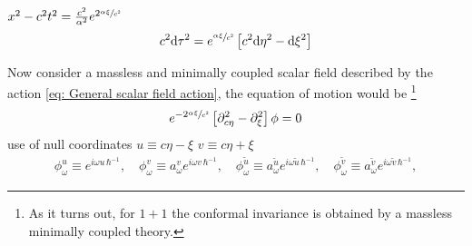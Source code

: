 $x^2-c^2t^2=\frac{c^2}{\alpha^2}e^{2\sfrac{\alpha\xi}{c^2}}$
\begin{equation}
	c^2\text{d} \tau^2=e^{\sfrac{\alpha\xi}{c^2}}\left[c^2\text{d}\eta^2-\text{d}\xi^2\right]
\end{equation}

Now consider a massless and minimally coupled scalar field described by the action \ref{eq: General scalar field action}, the equation of motion would be \footnote{As it turns out, for $1+1$ the conformal invariance is obtained by a massless minimally coupled theory.}
\begin{equation}
	e^{-2\sfrac{\alpha\xi}{c^2}}\left[\partial^2_{c\eta}-\partial^2_\xi\right]\phi=0
\end{equation}
use of null coordinates $u\equiv c\eta-\xi$ $v\equiv c\eta+\xi$ 
\begin{subequations}
	\begin{gather}
		\phi_\omega^u\equiv e^{i\omega u\,\hbar^{-1}},\quad \phi_\omega^v\equiv  a^v_\omega e^{i\omega v\,\hbar^{-1}},\quad\phi_\omega^{\tilde u}\equiv a^{\tilde u}_\omega e^{i\omega \tilde u\,\hbar^{-1}},\quad\phi_\omega^{\tilde v}\equiv  a^{\tilde v}_\omega e^{i\omega \tilde v\,\hbar^{-1}},\tag{\theequation \,\,a-d}
	\end{gather}
\end{subequations}




